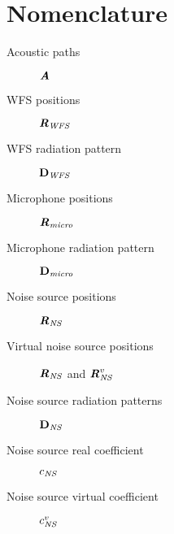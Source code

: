\chapter{Nomenclature}

\begin{description}
	\item[Acoustic paths] $\bm{\mathit{A}}$
	\item[WFS positions] $\Pos[mat][WFS]$
	\item[WFS radiation pattern] $\Diag[vec][WFS]$
	\item[Microphone positions] $\Pos[mat][micro]$
	\item[Microphone radiation pattern] $\Diag[vec][micro]$
	\item[Noise source positions] $\Pos[mat][NS]$
	\item[Virtual noise source positions] $\Pos[mat][NS]$ and $\Pos[mat][NS]<virtual>$
	\item[Noise source radiation patterns] $\Diag[vec][NS]$
	\item[Noise source real coefficient] $\coef[scalar][NS]$
	\item[Noise source virtual coefficient] $\coef[scalar][NS]<virtual>$
\end{description}